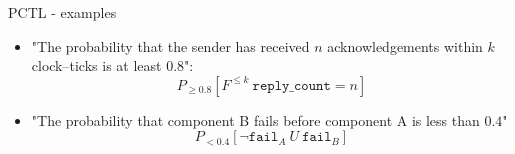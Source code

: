 \documentclass[dvipsnames]{beamer}
\begin{document}
\begin{frame}{PCTL - examples}

    \begin{itemize}
        \item "The probability that the sender has received $n$ acknowledgements within $k$ clock--ticks is at least $0.8$":
              \[
                  P_{\geq 0.8}\left[
                      F^{\leq k}\ \texttt{reply\_count}=n
                      \right]
              \]

        \item "The probability that component B fails before component A is less than $0.4$"
              \[
                  P_{<0.4}\left[
                      \neg \texttt{fail}_A \ U \ \texttt{fail}_B
                      \right]
              \]
    \end{itemize}

\end{frame}
\end{document}

